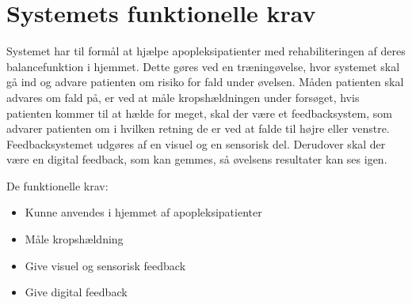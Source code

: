 \section{Systemets funktionelle krav}

Systemet har til formål at hjælpe apopleksipatienter med rehabiliteringen af deres balancefunktion i hjemmet. Dette gøres ved en træningøvelse, hvor systemet skal gå ind og advare patienten om risiko for fald under øvelsen. Måden patienten skal advares om fald på, er ved at måle kropshældningen under forsøget, hvis patienten kommer til at hælde for meget, skal der være et feedbacksystem, som advarer patienten om i hvilken retning de er ved at falde til højre eller venstre. Feedbacksystemet udgøres af en visuel og en sensorisk del. %
Derudover skal der være en digital feedback, som kan gemmes, så øvelsens resultater kan ses igen. 

De funktionelle krav:
\begin{itemize}
\item Kunne anvendes i hjemmet af apopleksipatienter
\item Måle kropshældning
\item Give visuel og sensorisk feedback
\item Give digital feedback
\end{itemize}